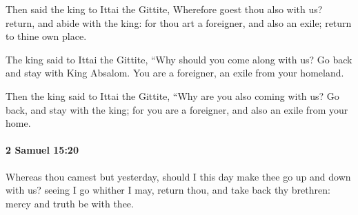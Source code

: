 			\begin{versebox}
					\item[BHS] 
					\item[ASV] Then said the king to Ittai the Gittite, Wherefore goest thou also with us? return, and abide with the king: for thou art a foreigner, and also an exile; return to thine own place.
					\item[NIV] The king said to Ittai the Gittite, “Why should you come along with us? Go back and stay with King Absalom. You are a foreigner, an exile from your homeland.
					\item[NRSV] Then the king said to Ittai the Gittite, “Why are you also coming with us? Go back, and stay with the king; for you are a foreigner, and also an exile from your home.
			\end{versebox}

		\paragraph{2 Samuel 15:20} %
			\label{2SAMUEL-15-20}

			Whereas thou camest but yesterday, should I this day make thee go up and down with us? seeing I go whither I may, return thou, and take back thy brethren: mercy and truth be with thee.

